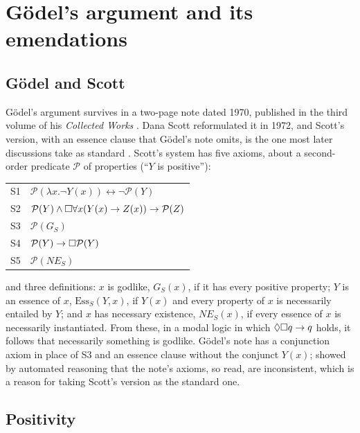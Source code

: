 \documentclass{situationist-preprint}
\newcommand{\Pos}{\mathcal{P}}
\newcommand{\NE}{\mathit{NE}}
\newcommand{\Ess}{\mathrm{Ess}}
\newcommand{\GS}{G_{\!S}}
\begin{document}
\section{Gödel's argument and its emendations}\label{s:history}

\subsection{Gödel and Scott}

Gödel's argument survives in a two-page note dated 1970, published in the third volume of his \emph{Collected Works} \citep{Godel1995}. Dana Scott reformulated it in 1972, and Scott's version, with an essence clause that Gödel's note omits, is the one most later discussions take as standard \citep{Sobel1987, Sobel2004, Fitting2002}. Scott's system has five axioms, about a second-order predicate $\Pos$ of properties (\enquote{$Y$ is positive}):

\begin{center}\small
\begin{tabular}{@{}ll@{}}
S1 & $\Pos(\lambda x.\neg Y(x)) \leftrightarrow \neg\Pos(Y)$ \\
S2 & $\Pos(Y) \wedge \nec\forall x(Y(x) \to Z(x)) \to \Pos(Z)$ \\
S3 & $\Pos(\GS)$ \\
S4 & $\Pos(Y) \to \nec\Pos(Y)$ \\
S5 & $\Pos(\NE_S)$
\end{tabular}
\end{center}

\noindent and three definitions: $x$ is godlike, $\GS(x)$, if it has every positive property; $Y$ is an essence of $x$, $\Ess_S(Y,x)$, if $Y(x)$ and every property of $x$ is necessarily entailed by $Y$; and $x$ has necessary existence, $\NE_S(x)$, if every essence of $x$ is necessarily instantiated. From these, in a modal logic in which $\mathord{\Diamond}\mathord{\Box} q \to q$ holds, it follows that necessarily something is godlike. Gödel's note has a conjunction axiom in place of S3 and an essence clause without the conjunct $Y(x)$; \citet{Benzmuller2016} showed by automated reasoning that the note's axioms, so read, are inconsistent, which is a reason for taking Scott's version as the standard one.

\subsection{Positivity}
\end{document}
